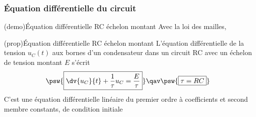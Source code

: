 \documentclass[../../main/main.tex]{subfiles}
\begin{document}
\subsubsection{Équation différentielle du circuit}
\begin{tcb*}[label=demo:eqdiffrc,
  list entry={\lte\thedemo~:~Équa. diff. RC montant}]
  (demo){Équation différentielle RC échelon montant}
	Avec la loi des mailles,
  \vspace{-25pt}
	\vspace{-15pt}
\end{tcb*}
\begin{tcb*}[label=prop:eqdiffrc, sidebyside, righthand ratio=.4,
  list entry={\lte\theprop~:~Équa. diff. RC montant}]
  (prop){Équation différentielle RC échelon montant}
	L'équation différentielle de la tension $u_C(t)$ aux bornes d'un condensateur
	dans un circuit RC avec un échelon de tension montant $E$ s'écrit
		\[
      \psw{%
        \boxed{\dv{u_C}{t} + \frac{1}{\tau}u_C = \frac{E}{\tau}}
      }%
      \qav
      \psw{%
        \boxed{\tau = RC}
      }%
		\]
	\tcblower
	C'est une équation différentielle linéaire du premier ordre à
	coefficients et second membre constants, de condition initiale
	\psw{%
		\[
			\boxed{u_C(0^-) = u_C(0^+) = 0}
		\]
	}%
\end{tcb*}
\end{document}
